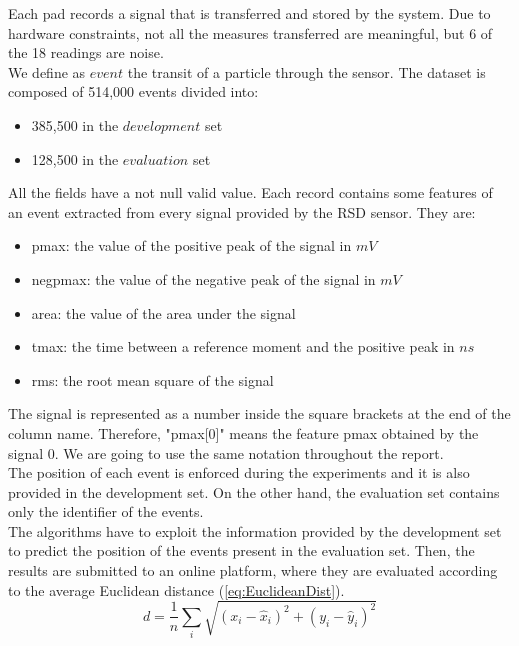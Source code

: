 \documentclass[conference]{IEEEtran}
\begin{document}
Each pad records a signal that is transferred and stored by the system. Due to hardware constraints, not all the measures transferred are meaningful, but 6 of the 18 readings are noise. \\

We define as $event$ the transit of a particle through the sensor. The dataset is composed of 514,000 events divided into:
\begin{itemize}
    \item 385,500 in the $development$ set
    \item 128,500 in the $evaluation$ set
\end{itemize}

All the fields have a not null valid value. Each record contains some features of an event extracted from every signal provided by the RSD sensor. They are:
\begin{itemize}
    \label{lst:typeFeature}
    \item pmax: the value of the positive peak of the signal in $mV$
    \item negpmax: the value of the negative peak of the signal in $mV$
    \item area: the value of the area under the signal
    \item tmax: the time between a reference moment and the positive peak in $ns$
    \item rms: the root mean square of the signal
\end{itemize}
The signal is represented as a number inside the square brackets at the end of the column name. Therefore, "pmax[0]" means the feature pmax obtained by the signal 0. We are going to use the same notation throughout the report.\\
The position of each event is enforced during the experiments and it is also provided in the development set. On the other hand, the evaluation set contains only the identifier of the events. \\

The algorithms have to exploit the information provided by the development set to predict the position of the events present in the evaluation set. Then, the results are submitted to an online platform, where they are evaluated according to the average Euclidean distance (\ref{eq:EuclideanDist}).
\begin{equation}
    \label{eq:EuclideanDist}
    d=\frac{1}{n} \sum_i \sqrt{(x_i-\hat{x}_i)^2+(y_i-\hat{y}_i)^2}
\end{equation} 
\end{document}
